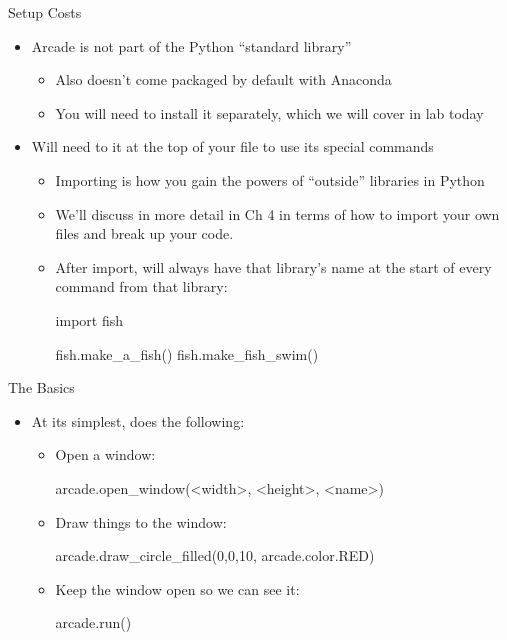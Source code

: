 \documentclass[pdf, aspectratio=169, 12pt]{beamer}
\begin{document}
\begin{frame}[fragile]{Setup Costs}
	\vspace{5mm}
	\begin{itemize}
		\item Arcade is not part of the Python ``standard library''
			\begin{itemize}
				\item Also doesn't come packaged by default with Anaconda
				\item You will need to install it separately, which we will cover in lab today
			\end{itemize}
		\item Will need to  it at the top of your file to use its special commands
			\begin{itemize}
				\item Importing is how you gain the powers of ``outside'' libraries in Python
				\item We'll discuss in more detail in Ch 4 in terms of how to import your own files and break up your code.
				\item After import, will always have that library's name at the start of every command from that library:
					\begin{pythoncode}
						import fish

						fish.make_a_fish()
						fish.make_fish_swim()
					\end{pythoncode}
			\end{itemize}
	\end{itemize}
\end{frame}

\begin{frame}[fragile]{The Basics}
	\begin{itemize}
		\item At its simplest,  does the following:
			\begin{itemize}
				\item Open a window:
					\begin{pythoncode}
						arcade.open_window(<width>, <height>, <name>)
					\end{pythoncode}
				\item Draw things to the window:
					\begin{pythoncode}
						arcade.draw_circle_filled(0,0,10, arcade.color.RED)
					\end{pythoncode}
				\item Keep the window open so we can see it:
					\begin{pythoncode}
						arcade.run()
					\end{pythoncode}
			\end{itemize}
	\end{itemize}
\end{frame}
\end{document}
